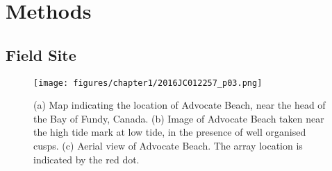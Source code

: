 \section{Methods}\label{ch1:Methods}

\subsection{Field Site}\label{subsec:Site}

\begin{figure} %
		\noindent\texttt{[image: figures/chapter1/2016JC012257\_p03.png]}
	\caption[Advocate Beach site map and aerial photo]{(a) Map indicating the location of Advocate Beach, near the head of the Bay of Fundy, Canada. (b) Image of Advocate Beach taken near the high tide mark at low tide, in the presence of well organised cusps. (c) Aerial view of Advocate Beach. The array location is indicated by the red dot.}
	\label{fig:Adv}
\end{figure}

